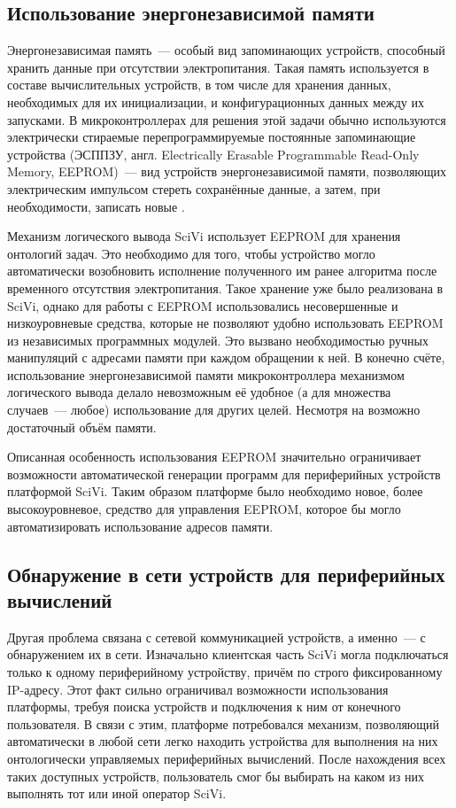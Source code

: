 \subsection{Использование энергонезависимой памяти}

Энергонезависимая память~--- особый вид запоминающих устройств, способный хранить данные при отсутствии электропитания.
Такая память используется в составе вычислительных устройств, в том числе для хранения данных, необходимых для их инициализации, и конфигурационных данных между их запусками.
В микроконтроллерах для решения этой задачи обычно используются электрически стираемые перепрограммируемые постоянные запоминающие устройства (ЭСППЗУ, англ. Electrically Erasable Programmable Read-Only Memory, EEPROM)~--- вид устройств энергонезависимой памяти, позволяющих электрическим импульсом стереть сохранённые данные, а затем, при необходимости, записать новые \cite{incollection:eeprom-proposal, article:eeprom}.

Механизм логического вывода SciVi использует EEPROM для хранения онтологий задач.
Это необходимо для того, чтобы устройство могло автоматически возобновить исполнение полученного им ранее алгоритма после временного отсутствия электропитания.
Такое хранение уже было реализована в SciVi, однако для работы с EEPROM использовались несовершенные и низкоуровневые средства, которые не позволяют удобно использовать EEPROM из независимых программных модулей.
Это вызвано необходимостью ручных манипуляций с адресами памяти при каждом обращении к ней.
В конечно счёте, использование энергонезависимой памяти микроконтроллера механизмом логического вывода делало невозможным её удобное (а для множества случаев~--- любое) использование для других целей.
Несмотря на возможно достаточный объём памяти.

Описанная особенность использования EEPROM значительно ограничивает возможности автоматической генерации программ для периферийных устройств платформой SciVi.
Таким образом платформе было необходимо новое, более высокоуровневое, средство для управления EEPROM, которое бы могло автоматизировать использование адресов памяти.

\subsection{Обнаружение в сети устройств для периферийных вычислений}

Другая проблема связана с сетевой коммуникацией устройств, а именно~--- с обнаружением их в сети.
Изначально клиентская часть SciVi могла подключаться только к одному периферийному устройству, причём по строго фиксированному IP-адресу.
Этот факт сильно ограничивал возможности использования платформы, требуя поиска устройств и подключения к ним от конечного пользователя. 
В связи с этим, платформе потребовался механизм, позволяющий автоматически в любой сети легко находить устройства для выполнения на них онтологически управляемых периферийных вычислений.
После нахождения всех таких доступных устройств, пользователь смог бы выбирать на каком из них выполнять тот или иной оператор SciVi. 

